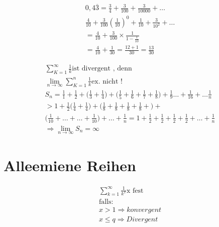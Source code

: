 \begin{example}
\begin{equation}
\begin{aligned}
0,4 \overline{3} = \frac{3}{4} + \frac{3}{100} + \frac{3}{10000}+ \dots \\
\frac{4}{10} + \frac{3}{100}(\frac{1}{10})^0 + \frac{1}{10} + \frac{3}{10^2} + \dots \\
=\frac{4}{10} + \frac{3}{100} \times \frac{1}{1-\frac{1}{10}}\\
= \frac{4}{10}+ \frac{1}{30} = \frac{12+1}{30}= \frac{13}{30}
\end{aligned}
\end{equation}
\end{example}

\begin{example}
\begin{equation}
\begin{aligned}
\sum_{K=1}^\infty{\frac{1}{k}} \text{ist divergent , denn }\\
\lim_{n \to \infty} \sum_{K=1}^n{\frac{1}{k}} \text{ex. nicht ! }\\
S_n = \frac{1}{1} + \frac{1}{2} + \big(\frac{1}{3} + \frac{1}{4} \big)+
\big(\frac{1}{5} + \frac{1}{6} + \frac{1}{7} + \frac{1}{8} \big) 
+ \frac{1}{9} \dots + \frac{1}{16} + \dots \frac{1}{n} \\
 > 1 + \frac{1}{2} \big(\frac{1}{4} + \frac{1}{4} \big) + 
 \big(\frac{1}{8}+ \frac{1}{8}+ \frac{1}{8}+ \frac{1}{8}+ \big)+ \\
 \big( \frac{1}{10} + \dots + \dots + \frac{1}{10} \big)+ \dots + \frac{1}{n}= 1+ \frac{1}{2} + \frac{1}{2} + \frac{1}{2} + \frac{1}{2}+ \dots + \frac{1}{n}\\
 \Rightarrow \lim_{n \to \infty}S_n=\infty
\end{aligned}
\end{equation}
\end{example}

\section{Alleemiene Reihen}
\begin{lemma}
\begin{equation}
\begin{aligned}
\sum_{k=1}^\infty {\frac{1}{k^x}} \text{x fest}\\
\text{falls:}\\
x > 1 \Rightarrow konvergent\\
x \leq q \Rightarrow Divergent\\
\end{aligned}
\end{equation}
\end{lemma}


